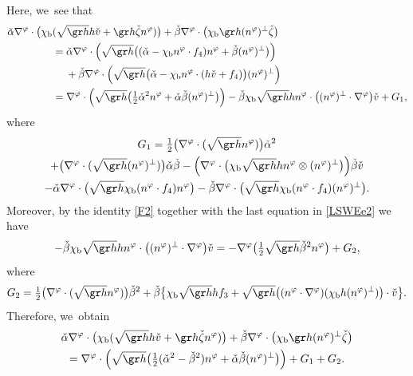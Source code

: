 Here, we~see that
\begin{align*}
\check{\alpha}\nabla^\varphi\cdot\bigl(\chi_\mathrm{b}&(\sqrt{\gr h}h\check{v} + \gr h\check{\zeta}n^\varphi)\bigr)
+ \check{\beta}\nabla^\varphi\cdot\bigl(\chi_\mathrm{b}\gr h(n^\varphi)^\perp\check{\zeta}\bigr) \\
&= \check{\alpha}\nabla^\varphi\cdot\Bigl(\sqrt{\gr h}\bigl((\check{\alpha}-\chi_\mathrm{b}n^\varphi\cdot f_4)n^\varphi + \check{\beta}(n^\varphi)^\perp\bigr)\Bigr) \\
&\quad\; + \check{\beta}\nabla^\varphi\cdot\Bigl(\sqrt{\gr h}\bigl(\check{\alpha}-\chi_\mathrm{b}n^\varphi\cdot(h\check{v}+f_4)\bigr) (n^\varphi)^\perp\Bigr) \\
&= \nabla^\varphi\cdot\Bigl(\sqrt{\gr h}\bigl(\tfrac12\check{\alpha}^2n^\varphi + \check{\alpha}\check{\beta}(n^\varphi)^\perp\bigr)\Bigr)
- \check{\beta}\chi_\mathrm{b}\sqrt{\gr h}h n^\varphi\cdot\bigl((n^\varphi)^\perp\cdot\nabla^\varphi\bigr)\check{v} + G_1,
\end{align*}
where
\begin{multline*}
G_1
= \tfrac12\bigl(\nabla^\varphi\cdot(\sqrt{\gr h}n^\varphi)\bigr)\check{\alpha}^2\\
+ \bigl(\nabla^\varphi\cdot(\sqrt{\gr h}(n^\varphi)^\perp)\bigr)\check{\alpha}\check{\beta}
- \Bigl(\nabla^\varphi\cdot\bigl(\chi_\mathrm{b}\sqrt{\gr h}h n^\varphi\otimes(n^\varphi)^\perp\bigr)\Bigr)\check{\beta}\check{v}\\
- \check{\alpha}\nabla^\varphi\cdot\bigl(\sqrt{\gr h}\chi_\mathrm{b}(n^\varphi\cdot f_4)n^\varphi\bigr)
- \check{\beta}\nabla^\varphi\cdot\bigl(\sqrt{\gr h}\chi_\mathrm{b}(n^\varphi\cdot f_4)(n^\varphi)^\perp\bigr).
\end{multline*}
Moreover, by the identity \eqref{F2} together with the last equation in \eqref{LSWEe2} we have
\[
- \check{\beta}\chi_\mathrm{b}\sqrt{\gr h}h n^\varphi\cdot\bigl((n^\varphi)^\perp\cdot\nabla^\varphi\bigr)\check{v}
= -\nabla^\varphi\bigl(\tfrac12\sqrt{\gr h}\check{\beta}^2n^\varphi\bigr) + G_2,
\]
where
\[
G_2 = \tfrac12\bigl(\nabla^\varphi\cdot(\sqrt{\gr h} n^\varphi)\bigr)\check{\beta}^2
+ \check{\beta}\bigl\{ \chi_\mathrm{b}\sqrt{\gr h}hf_3 + \sqrt{\gr h}\bigl((n^\varphi\cdot\nabla^\varphi)(\chi_\mathrm{b}h(n^\varphi)^\perp)\bigr)\cdot\check{v} \bigr\}.
\]
Therefore, we~obtain
\begin{multline}\label{EqCF2}
\check{\alpha}\nabla^\varphi\cdot\bigl(\chi_\mathrm{b}(\sqrt{\gr h}h\check{v} + \gr h\check{\zeta}n^\varphi)\bigr)
+ \check{\beta}\nabla^\varphi\cdot\bigl(\chi_\mathrm{b}\gr h(n^\varphi)^\perp\check{\zeta}\bigr) \\
= \nabla^\varphi\cdot\Bigl(\sqrt{\gr h}\bigl(\tfrac12(\check{\alpha}^2-\check{\beta}^2)n^\varphi + \check{\alpha}\check{\beta}(n^\varphi)^\perp\bigr)\Bigr) + G_1 + G_2.
\end{multline}
